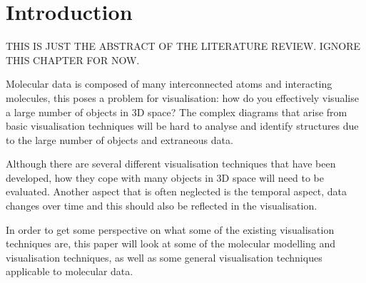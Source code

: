 \chapter{Introduction}
\label{cha:introduction}

THIS IS JUST THE ABSTRACT OF THE LITERATURE REVIEW. IGNORE THIS CHAPTER FOR
NOW.

Molecular data is composed of many interconnected atoms and interacting
molecules, this poses a problem for visualisation: how do you effectively
visualise a large number of objects in 3D space? The complex diagrams that arise
from basic visualisation techniques will be hard to analyse and identify
structures due to the large number of objects and extraneous data.

Although there are several different visualisation techniques that have been
developed, how they cope with many objects in 3D space will need to be
evaluated. Another aspect that is often neglected is the temporal aspect, data
changes over time and this should also be reflected in the visualisation.

In order to get some perspective on what some of the existing visualisation
techniques are, this paper will look at some of the molecular modelling and
visualisation techniques, as well as some general visualisation techniques
applicable to molecular data.
 

